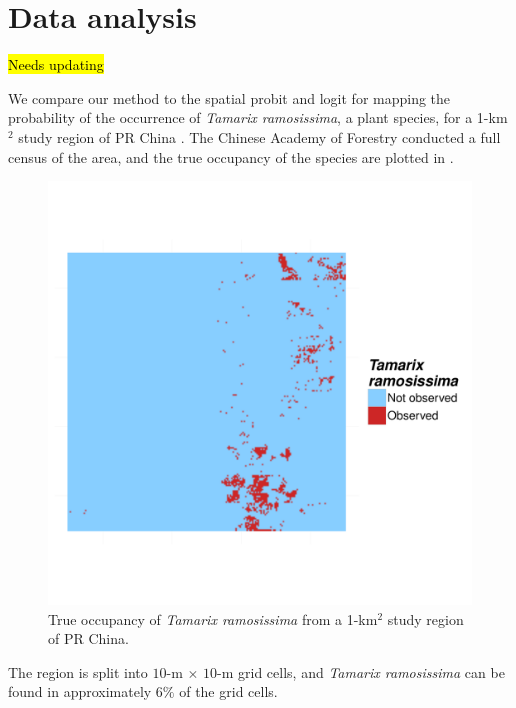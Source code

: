 \documentclass[11pt]{article}
\begin{document}



\section{Data analysis}\label{rbs:dataanalysis}
\hl{Needs updating}

We compare our method to the spatial probit and logit for mapping the probability of the occurrence of \emph{Tamarix ramosissima}, a plant species, for a 1-km$^2$ study region of PR China \citet{Smith2012}.
The Chinese Academy of Forestry conducted a full census of the area, and the true occupancy of the species are plotted in .
\begin{figure}
  \centering
  \includegraphics[width=0.5\linewidth, trim=0 10em 0 10em]{plots/tamarix-census.pdf}
  \caption{True occupancy of \emph{Tamarix ramosissima} from a 1-km$^2$ study region of PR China.}
  \label{rbfig:occupancy}
\end{figure}
The region is split into $10$-m $\times$ $10$-m grid cells, and \emph{Tamarix ramosissima} can be found in approximately $6\%$ of the grid cells.
\end{document}
